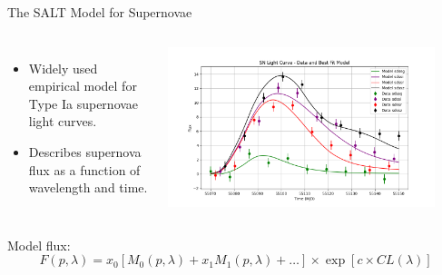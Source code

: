 \documentclass[aspectratio=169]{beamer}
\begin{document}
\begin{frame}{The SALT Model for Supernovae}
  \begin{columns}
      \begin{itemize}
        \item Widely used empirical model for Type Ia supernovae light curves.
        \item Describes supernova flux as a function of wavelength and time.
      \end{itemize}
      \centering
      \includegraphics[width=0.9\textwidth]{images/sncosmo-fitter.png}
  \end{columns}
  \vfill %
  \centering %
  Model flux:
  \begin{equation*}
    F(p, \lambda) = x_0 \left[M_0(p, \lambda) + x_1M_1(p, \lambda) + \dots\right] \times \exp \left[c \times CL(\lambda)\right]
  \end{equation*}
\end{frame}
\end{document}
